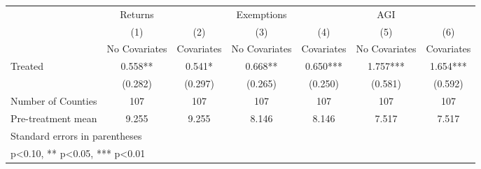 {
\def\sym#1{\ifmmode^{#1}\else\(^{#1}\)\fi}
\begin{tabular}{l*{6}{c}}
\hline\hline
            &     Returns   &               &  Exemptions   &               &         AGI   &               \\
            &\multicolumn{1}{c}{(1)}&\multicolumn{1}{c}{(2)}&\multicolumn{1}{c}{(3)}&\multicolumn{1}{c}{(4)}&\multicolumn{1}{c}{(5)}&\multicolumn{1}{c}{(6)}\\
            &\multicolumn{1}{c}{No Covariates}&\multicolumn{1}{c}{Covariates}&\multicolumn{1}{c}{No Covariates}&\multicolumn{1}{c}{Covariates}&\multicolumn{1}{c}{No Covariates}&\multicolumn{1}{c}{Covariates}\\
\hline
Treated     &       0.558** &       0.541*  &       0.668** &       0.650***&       1.757***&       1.654***\\
            &     (0.282)   &     (0.297)   &     (0.265)   &     (0.250)   &     (0.581)   &     (0.592)   \\
\hline
Number of Counties&         107   &         107   &         107   &         107   &         107   &         107   \\
Pre-treatment mean&       9.255   &       9.255   &       8.146   &       8.146   &       7.517   &       7.517   \\
\hline\hline
\multicolumn{7}{l}{\footnotesize Standard errors in parentheses}\\
\multicolumn{7}{l}{\footnotesize * p<0.10, ** p<0.05, *** p<0.01}\\
\end{tabular}
}
